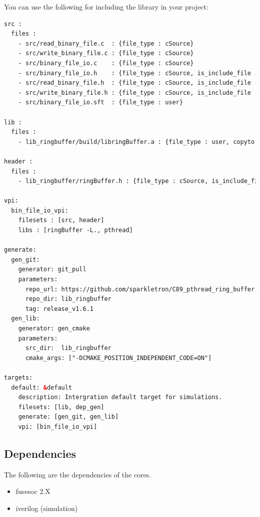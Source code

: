 You can use the following for including the library in your project:

\begin{lstlisting}[language=XML]
src :
  files :
    - src/read_binary_file.c  : {file_type : cSource}
    - src/write_binary_file.c : {file_type : cSource}
    - src/binary_file_io.c    : {file_type : cSource}
    - src/binary_file_io.h    : {file_type : cSource, is_include_file : true}
    - src/read_binary_file.h  : {file_type : cSource, is_include_file : true}
    - src/write_binary_file.h : {file_type : cSource, is_include_file : true}
    - src/binary_file_io.sft  : {file_type : user}

lib :
  files :
    - lib_ringbuffer/build/libringBuffer.a : {file_type : user, copyto : .}

header :
  files :
    - lib_ringbuffer/ringBuffer.h : {file_type : cSource, is_include_file : true}

vpi:
  bin_file_io_vpi:
    filesets : [src, header]
    libs : [ringBuffer -L., pthread]

generate:
  gen_git:
    generator: git_pull
    parameters:
      repo_url: https://github.com/sparkletron/C89_pthread_ring_buffer.git
      repo_dir: lib_ringbuffer
      tag: release_v1.6.1
  gen_lib:
    generator: gen_cmake
    parameters:
      src_dir:  lib_ringbuffer
      cmake_args: ["-DCMAKE_POSITION_INDEPENDENT_CODE=ON"]

targets:
  default: &default
    description: Intergration default target for simulations.
    filesets: [lib, dep_gen]
    generate: [gen_git, gen_lib]
    vpi: [bin_file_io_vpi]
\end{lstlisting}

\subsection{Dependencies}

\par
The following are the dependencies of the cores.

\begin{itemize}
  \item fusesoc 2.X
  \item iverilog (simulation)
\end{itemize}



